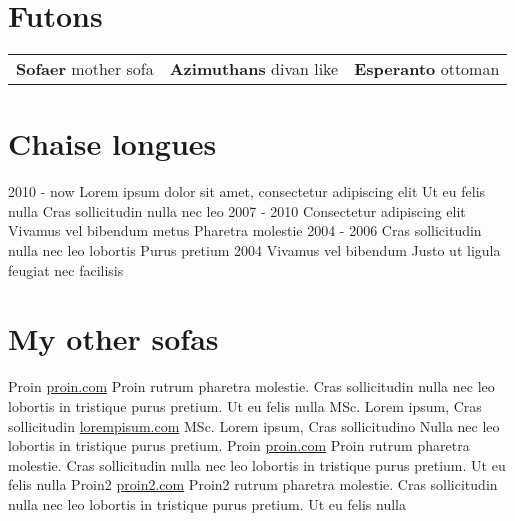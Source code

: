 \documentclass[]{viccuad-cv}
\begin{document}
\section{Futons}
    \begin{tabularx}{\linewidth}{XXr}
        \textbf{Sofaer} mother sofa & \textbf{Azimuthans} divan like & \textbf{Esperanto} ottoman \tabularnewline
    \end{tabularx}
 

\section{Chaise longues}
    \begin{entrylistdated}
      \entrydated
        {2010 - now}
        {Lorem ipsum dolor sit amet, consectetur adipiscing elit}
        {Ut eu felis nulla}
        {Cras sollicitudin nulla nec leo}
      \entrydated
        {2007 - 2010}
        {Consectetur adipiscing elit}
        {Vivamus vel bibendum metus}
        {Pharetra molestie}
      \entrydated
        {2004 - 2006}
        {Cras sollicitudin nulla nec leo lobortis}
        {}
        {Purus pretium} 
      \entrydated
        {2004}
        {Vivamus vel bibendum}
        {Justo ut ligula feugiat nec facilisis}
        {}
    \end{entrylistdated}

\section{My other sofas}
    \begin{entrylist}
      \entry
        {Proin}
        {\href{https://proin.com}{proin.com}}
        {Proin rutrum pharetra molestie. Cras sollicitudin nulla nec leo lobortis in tristique purus pretium. Ut eu felis nulla}
      \entry
        {MSc. Lorem ipsum, Cras sollicitudin}
        {\href{http://loremipsum.com}{lorempisum.com}}
        {}
      \entry
        {MSc. Lorem ipsum, Cras sollicitudino}
        {}
        {Nulla nec leo lobortis in tristique purus pretium.}
      \entry
        {Proin}
        {\href{https://proin.com}{proin.com}}
        {Proin rutrum pharetra molestie. Cras sollicitudin nulla nec leo lobortis in tristique purus pretium. Ut eu felis nulla}
      \entry
        {Proin2}
        {\href{https://proin2.com}{proin2.com}}
        {Proin2 rutrum pharetra molestie. Cras sollicitudin nulla nec leo lobortis in tristique purus pretium. Ut eu felis nulla}
    \end{entrylist}
\end{document}
